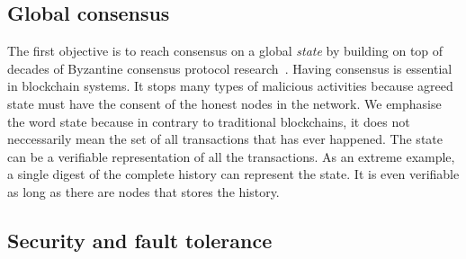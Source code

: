 \subsection{Global consensus}


The first objective is to reach consensus on a global \emph{state} by building on top of decades of Byzantine consensus protocol research~\cite{pease1980reaching, lamport1982byzantine, castro1999practical, miller2016honey}.
Having consensus is essential in blockchain systems.
It stops many types of malicious activities because agreed state must have the consent of the honest nodes in the network.
We emphasise the word state because in contrary to traditional blockchains,
it does not neccessarily mean the set of all transactions that has ever happened.
The state can be a verifiable representation of all the transactions.
As an extreme example, a single digest of the complete history can represent the state.
It is even verifiable as long as there are nodes that stores the history.


\subsection{Security and fault tolerance}

